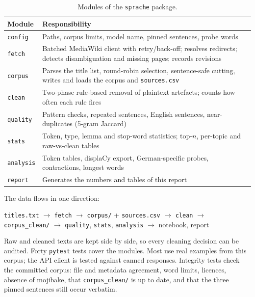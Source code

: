 \documentclass[11pt,a4paper]{article}
\newcommand{\code}[1]{\texttt{#1}}
\begin{document}
\begin{table}[h]\centering\small
\caption{Modules of the \code{sprache} package.}\label{tab:modules}
\begin{tabularx}{\linewidth}{lX}\toprule
Module & Responsibility \\\midrule
\code{config} & Paths, corpus limits, model name, pinned sentences, probe words \\
\code{fetch} & Batched MediaWiki client with retry/back-off; resolves redirects; detects disambiguation and missing pages; records revisions \\
\code{corpus} & Parses the title list, round-robin selection, sentence-safe cutting, writes and loads the corpus and \code{sources.csv} \\
\code{clean} & Two-phase rule-based removal of plaintext artefacts; counts how often each rule fires \\
\code{quality} & Pattern checks, repeated sentences, English sentences, near-duplicates (5-gram Jaccard) \\
\code{stats} & Token, type, lemma and stop-word statistics; top-$n$, per-topic and raw-vs-clean tables \\
\code{analysis} & Token tables, displaCy export, German-specific probes, contractions, longest words \\
\code{report} & Generates the numbers and tables of this report \\\bottomrule
\end{tabularx}
\end{table}

\noindent The data flows in one direction:
\begin{center}\small
\code{titles.txt} $\rightarrow$ \code{fetch} $\rightarrow$ \code{corpus/} + \code{sources.csv} $\rightarrow$ \code{clean} $\rightarrow$ \code{corpus\_clean/} $\rightarrow$ \code{quality}, \code{stats}, \code{analysis} $\rightarrow$ notebook, report
\end{center}
\noindent Raw and cleaned texts are kept side by side, so every cleaning decision can be audited. Forty \code{pytest} tests cover the modules. Most use real examples from this corpus; the API client is tested against canned responses. Integrity tests check the committed corpus: file and metadata agreement, word limits, licences, absence of mojibake, that \code{corpus\_clean/} is up to date, and that the three pinned sentences still occur verbatim.

\end{document}
